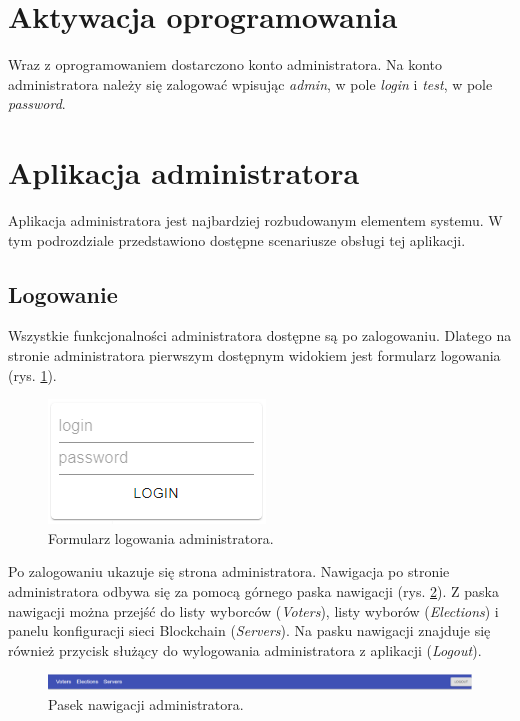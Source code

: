 \documentclass[a4paper,12pt]{book}
\begin{document}
\section{Aktywacja oprogramowania}

Wraz z oprogramowaniem dostarczono konto administratora. Na konto administratora należy się zalogować wpisując \textit{admin}, w pole \textit{login} i \textit{test}, w pole \textit{password}.

\section{Aplikacja administratora}

Aplikacja administratora jest najbardziej rozbudowanym elementem systemu. W tym podrozdziale przedstawiono dostępne scenariusze obsługi tej aplikacji.

\subsection{Logowanie}

Wszystkie funkcjonalności administratora dostępne są po zalogowaniu. Dlatego na stronie administratora pierwszym dostępnym widokiem jest formularz logowania (rys. \ref{adminlogin}).

\begin{figure}[h]
	\centering
	\includegraphics{images/adminlogin.png}
	\caption{Formularz logowania administratora.}\label{adminlogin}
\end {figure}

Po zalogowaniu ukazuje się strona administratora. Nawigacja po stronie administratora odbywa się za pomocą górnego paska nawigacji (rys. \ref{adminnav}). Z paska nawigacji można przejść do listy wyborców (\textit{Voters}), listy wyborów (\textit{Elections}) i panelu konfiguracji sieci Blockchain (\textit{Servers}). Na pasku nawigacji znajduje się również przycisk służący do wylogowania administratora z aplikacji (\textit{Logout}).

\begin{figure}[h]
	\centering
	\includegraphics[width=\textwidth]{images/adminnav.png}
	\caption{Pasek nawigacji administratora.}\label{adminnav}
\end {figure}
\end{document}
